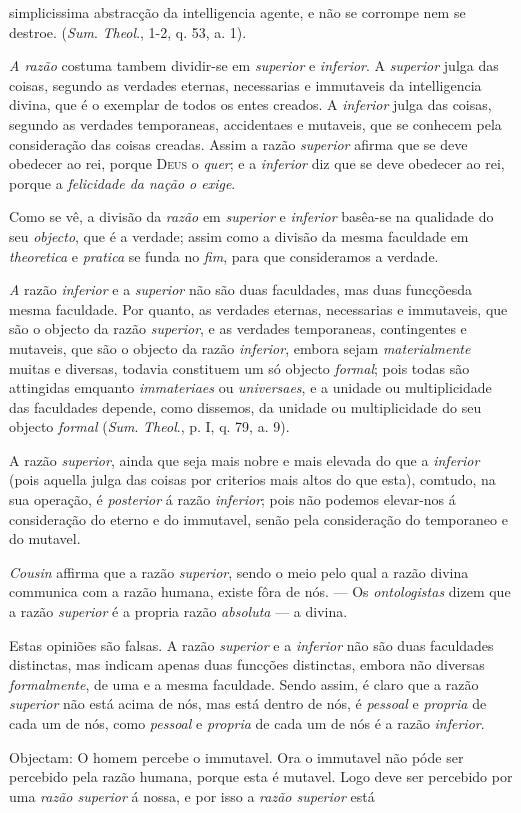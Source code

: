 simplicissima abstracção da intelligencia agente, e não se corrompe nem se destroe. (\emph{Sum}. \emph{Theol}., 1-2, q. 53, a. 1).\par \emph{A razão} costuma tambem dividir-se em \emph{superior} e \emph{inferior}. A \emph{superior} julga das coisas, segundo as verdades eternas, necessarias e immutaveis da intelligencia divina, que é o exemplar de todos os entes creados. A \emph{inferior} julga das coisas, segundo as verdades temporaneas, accidentaes e mutaveis, que se conhecem pela consideração das coisas creadas. Assim a razão \emph{superior} afirma que se deve obedecer ao rei, porque \textsc{Deus} o \emph{quer}; e a \emph{inferior} diz que se deve obedecer ao rei, porque a \emph{felicidade da nação o exige}.\par Como se vê, a divisão da \emph{razão} em \emph{superior} e \emph{inferior} basêa-se na qualidade do seu \emph{objecto}, que é a verdade; assim como a divisão da mesma faculdade em \emph{theoretica} e \emph{pratica} se funda no \emph{fim}, para que consideramos a verdade.\par \emph{A} razão \emph{inferior} e a \emph{superior} não são duas faculdades, mas duas funcçõesda mesma faculdade. Por quanto, as verdades eternas, necessarias e immutaveis, que são o objecto da razão \emph{superior}, e as verdades temporaneas, contingentes e mutaveis, que são o objecto da razão \emph{inferior}, embora sejam \emph{materialmente} muitas e diversas, todavia constituem um só objecto \emph{formal}; pois todas são attingidas emquanto \emph{immateriaes} ou \emph{universaes}, e a unidade ou multiplicidade das faculdades depende, como dissemos, da unidade ou multiplicidade do seu objecto \emph{formal} (\emph{Sum}. \emph{Theol}., p. I, q. 79, a. 9).\par A razão \emph{superior}, ainda que seja mais nobre e mais elevada do que a \emph{inferior} (pois aquella julga das coisas por criterios mais altos do que esta), comtudo, na sua operação, é \emph{posterior} á razão \emph{inferior}; pois não podemos elevar-nos á consideração do eterno e do immutavel, senão pela consideração do temporaneo e do mutavel.\par \emph{Cousin} affirma que a razão \emph{superior}, sendo o meio pelo qual a razão divina communica com a razão humana, existe fôra de nós. --- Os \emph{ontologistas} dizem que a razão \emph{superior} é a propria razão \emph{absoluta} --- a divina.\par Estas opiniões são falsas. A razão \emph{superior} e a \emph{inferior} não são duas faculdades distinctas, mas indicam apenas duas funcções distinctas, embora não diversas \emph{formalmente}, de uma e a mesma faculdade. Sendo assim, é claro que a razão \emph{superior} não está acima de nós, mas está dentro de nós, é \emph{pessoal} e \emph{propria} de cada um de nós, como \emph{pessoal} e \emph{propria} de cada um de nós é a razão \emph{inferior}.\par Objectam: O homem percebe o immutavel. Ora o immutavel não póde ser percebido pela razão humana, porque esta é mutavel. Logo deve ser percebido por uma \emph{razão superior} á nossa, e por isso a \emph{razão superior} está 